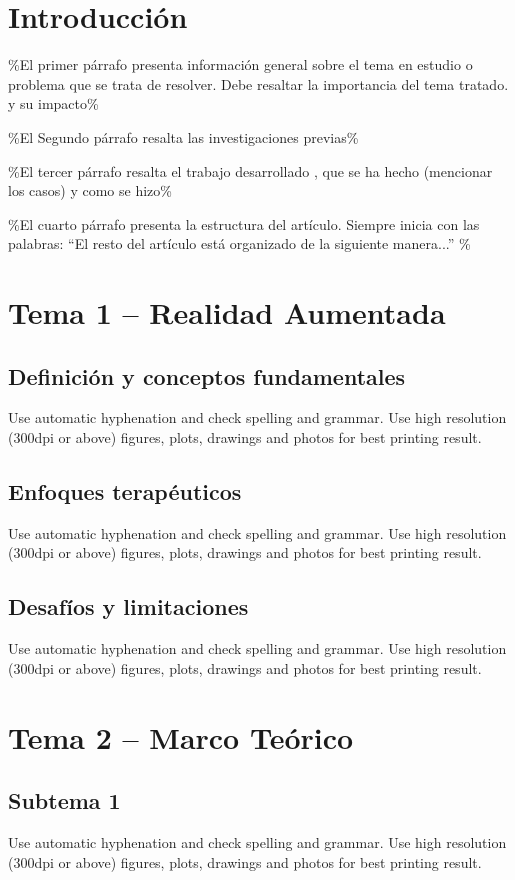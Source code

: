 \section{Introducción}

\%El primer párrafo presenta información general sobre el tema en estudio o problema que se trata de resolver. Debe resaltar la importancia del tema tratado. y su impacto\%

\%El Segundo párrafo resalta las investigaciones previas\%

\%El tercer párrafo resalta el trabajo desarrollado , que se ha hecho (mencionar los casos) y como se hizo\%

\%El cuarto párrafo presenta la estructura del artículo. Siempre inicia con las palabras: ``El resto del artículo está organizado de la siguiente manera...'' \%


\section{Tema 1 – Realidad Aumentada}

\subsection{Definición y conceptos fundamentales}
Use automatic hyphenation and check spelling and grammar. Use high resolution (300dpi or above) figures, plots, drawings and photos for best printing result.

\subsection{Enfoques terapéuticos}
Use automatic hyphenation and check spelling and grammar. Use high resolution (300dpi or above) figures, plots, drawings and photos for best printing result.

\subsection{Desafíos y limitaciones}
Use automatic hyphenation and check spelling and grammar. Use high resolution (300dpi or above) figures, plots, drawings and photos for best printing result.


\section{Tema 2 – Marco Teórico}
\subsection{Subtema 1}
Use automatic hyphenation and check spelling and grammar. Use high resolution (300dpi or above) figures, plots, drawings and photos for best printing result.

